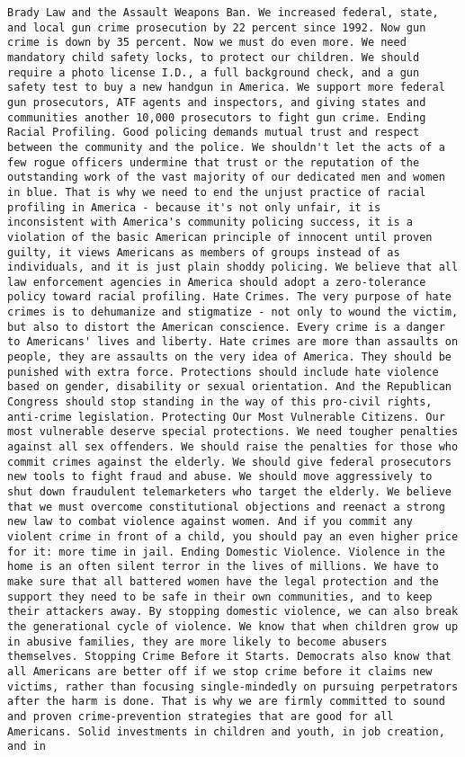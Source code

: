 \documentclass[
]{article}
\begin{document}
\begin{verbatim}
Brady Law and the Assault Weapons Ban. We increased federal, state, and local gun crime prosecution by 22 percent since 1992. Now gun crime is down by 35 percent. Now we must do even more. We need mandatory child safety locks, to protect our children. We should require a photo license I.D., a full background check, and a gun safety test to buy a new handgun in America. We support more federal gun prosecutors, ATF agents and inspectors, and giving states and communities another 10,000 prosecutors to fight gun crime. Ending Racial Profiling. Good policing demands mutual trust and respect between the community and the police. We shouldn't let the acts of a few rogue officers undermine that trust or the reputation of the outstanding work of the vast majority of our dedicated men and women in blue. That is why we need to end the unjust practice of racial profiling in America - because it's not only unfair, it is inconsistent with America's community policing success, it is a violation of the basic American principle of innocent until proven guilty, it views Americans as members of groups instead of as individuals, and it is just plain shoddy policing. We believe that all law enforcement agencies in America should adopt a zero-tolerance policy toward racial profiling. Hate Crimes. The very purpose of hate crimes is to dehumanize and stigmatize - not only to wound the victim, but also to distort the American conscience. Every crime is a danger to Americans' lives and liberty. Hate crimes are more than assaults on people, they are assaults on the very idea of America. They should be punished with extra force. Protections should include hate violence based on gender, disability or sexual orientation. And the Republican Congress should stop standing in the way of this pro-civil rights, anti-crime legislation. Protecting Our Most Vulnerable Citizens. Our most vulnerable deserve special protections. We need tougher penalties against all sex offenders. We should raise the penalties for those who commit crimes against the elderly. We should give federal prosecutors new tools to fight fraud and abuse. We should move aggressively to shut down fraudulent telemarketers who target the elderly. We believe that we must overcome constitutional objections and reenact a strong new law to combat violence against women. And if you commit any violent crime in front of a child, you should pay an even higher price for it: more time in jail. Ending Domestic Violence. Violence in the home is an often silent terror in the lives of millions. We have to make sure that all battered women have the legal protection and the support they need to be safe in their own communities, and to keep their attackers away. By stopping domestic violence, we can also break the generational cycle of violence. We know that when children grow up in abusive families, they are more likely to become abusers themselves. Stopping Crime Before it Starts. Democrats also know that all Americans are better off if we stop crime before it claims new victims, rather than focusing single-mindedly on pursuing perpetrators after the harm is done. That is why we are firmly committed to sound and proven crime-prevention strategies that are good for all Americans. Solid investments in children and youth, in job creation, and in 
\end{verbatim}
\end{document}
